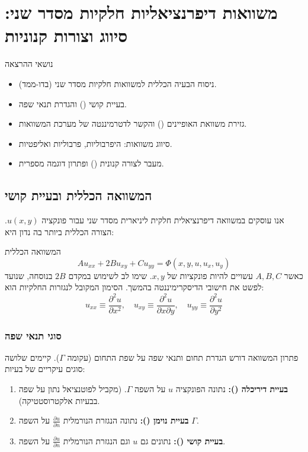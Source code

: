\section{משוואות דיפרנציאליות חלקיות מסדר שני: סיווג וצורות קנוניות}

\begin{mainbox}{נושאי ההרצאה}
    \begin{itemize}
        \item ניסוח הבעיה הכללית למשוואות חלקיות מסדר שני (בדו-ממד).
        \item בעיית קושי () והגדרת תנאי שפה.
        \item גזירת משוואת האופיינים () והקשר לדטרמיננטה של מערכת המשוואות.
        \item סיווג משוואות: היפרבוליות, פרבוליות ואליפטיות.
        \item מעבר לצורה קנונית () ופתרון דוגמה מספרית.
    \end{itemize}
\end{mainbox}

\subsection{המשוואה הכללית ובעיית קושי}

אנו עוסקים במשוואה דיפרנציאלית חלקית ליניארית מסדר שני עבור פונקציה $u(x,y)$. הצורה הכללית ביותר בה נדון היא:

\begin{definitionbox}{המשוואה הכללית}
    \begin{equation}
        A u_{xx} + 2B u_{xy} + C u_{yy} = \Phi(x, y, u, u_x, u_y)
        \label{eq:general_pde}
    \end{equation}
    כאשר $A, B, C$ עשויים להיות פונקציות של $x, y$. שימו לב לשימוש במקדם $2B$ בנוסחה, שנועד לפשט את חישובי הדיסקרימיננטה בהמשך. הסימון המקובל לנגזרות החלקיות הוא:
    \[ u_{xx} \equiv \frac{\partial^2 u}{\partial x^2}, \quad u_{xy} \equiv \frac{\partial^2 u}{\partial x \partial y}, \quad u_{yy} \equiv \frac{\partial^2 u}{\partial y^2} \]
\end{definitionbox}

\subsubsection{סוגי תנאי שפה}
פתרון המשוואה דורש הגדרת תחום ותנאי שפה על שפת התחום (עקומה $\Gamma$). קיימים שלושה סוגים עיקריים של בעיות:

\begin{enumerate}
    \item \textbf{בעיית דיריכלה ():} נתונה הפונקציה $u$ על השפה $\Gamma$. (מקביל לפוטנציאל נתון על שפה בבעיות אלקטרוסטטיקה).
    \item \textbf{בעיית נוימן ():} נתונה הנגזרת הנורמלית $\frac{\partial u}{\partial n}$ על השפה $\Gamma$.
    \item \textbf{בעיית קושי ():} נתונים גם $u$ וגם הנגזרת הנורמלית $\frac{\partial u}{\partial n}$ על השפה.
\end{enumerate}

